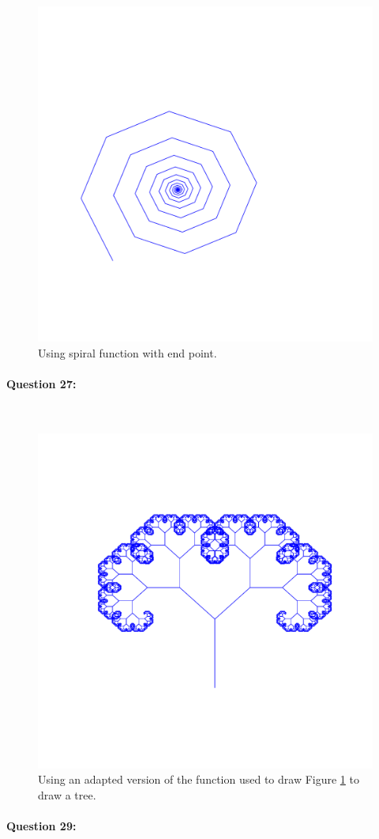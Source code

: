 \documentclass{article}
\begin{document}
\begin{figure}[H]
	\centering
	\includegraphics[width=0.5\linewidth,trim={2cm 3cm 6cm 5cm},clip]{../Results/spiral_2.pdf}
	\caption{Using spiral function with end point.}
	\label{fig:q26}
\end{figure}

\paragraph{Question 27:}\

\begin{figure}[H]
	\centering
	\includegraphics[width=0.5\linewidth,trim={3cm 3cm 2cm 2cm},clip]{../Results/tree.pdf}
	\caption{Using an adapted version of the function used to draw Figure \ref{fig:q26} to draw a tree.}
	\label{fig:q27}
\end{figure}

\newpage

\paragraph{Question 29:}\	
\end{document}
